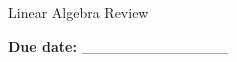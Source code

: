 \documentclass[12pt]{article}
\theoremstyle{remark}
\renewcommand{\=}{&=&}
\newcommand{\<}{\langle}
\renewcommand{\>}{\rangle}
\begin{document}
%
\newcommand{\deriv}[2]{\ensuremath{\frac{d{#1}}{d{#2}}}}
\newcommand{\dderiv}[2]{\ensuremath{\frac{d^2{#1}}{d{#2}^2}}}

\parindent=0in
%
\newenvironment{problems}
   {\begin{list}{{\bf A\arabic{probnum}:}}%
       {\setlength\labelwidth{.25in}%
         \setlength\leftmargin{0in}%
         \setlength\itemsep{\parsep}%
         \usecounter{probnum}}}%
   {\end{list}}
%
\pagestyle{fancy}
\lfoot{} 
\rfoot{}


\begin{center}
\Large Linear Algebra Review
\end{center}
{\bf Due date:} \_\_\_\_\_\_\_\_\_\_\_\_\_\_
\end{document}
